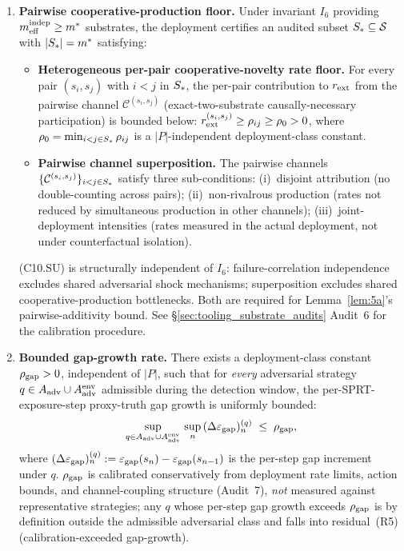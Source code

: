 \begin{theorem}
\begin{enumerate}
\item[(C10)] \textbf{Pairwise cooperative-production floor.}
  Under invariant $I_6$ providing $m_{\mathrm{eff}}^{\mathrm{indep}} \geq m^*$ substrates,
  the deployment certifies an audited subset $S_* \subseteq
  \mathcal{S}$ with $|S_*| = m^*$ satisfying:
  \begin{itemize}
  \item[\textbf{(C10.CN)}] \textbf{Heterogeneous per-pair
    cooperative-novelty rate floor.}  For every pair $(s_i, s_j)$
    with $i < j$ in $S_*$, the per-pair contribution to $r_{\mathrm{ext}}$
    from the pairwise channel $\mathcal{C}^{(s_i, s_j)}$
    (exact-two-substrate causally-necessary participation) is
    bounded below: $r_{\mathrm{ext}}^{(s_i, s_j)} \geq \rho_{ij} \geq \rho_0
    > 0$, where $\rho_0 = \min_{i<j \in S_*} \rho_{ij}$ is a
    $|P|$-independent deployment-class constant.
  \item[\textbf{(C10.SU)}] \textbf{Pairwise channel superposition.}
    The pairwise channels $\{\mathcal{C}^{(s_i, s_j)}\}_{i<j \in
    S_*}$ satisfy three sub-conditions:
    (i)~disjoint attribution (no double-counting across pairs);
    (ii)~non-rivalrous production (rates not reduced by
    simultaneous production in other channels);
    (iii)~joint-deployment intensities (rates measured in the
    actual deployment, not under counterfactual isolation).
  \end{itemize}
  (C10.SU) is structurally independent of $I_6$: failure-correlation
  independence excludes shared adversarial shock mechanisms;
  superposition excludes shared cooperative-production bottlenecks.
  Both are required for Lemma~\ref{lem:5a}'s pairwise-additivity
  bound.  See \S\ref{sec:tooling_substrate_audits} Audit~6 for the
  calibration procedure.
\item[(C11)] \textbf{Bounded gap-growth rate.}  There exists a
  deployment-class constant $\rho_{\mathrm{gap}} > 0$, independent of $|P|$,
  such that for \emph{every} adversarial strategy $q \in A_{\mathrm{adv}}
  \cup A_{\mathrm{adv}}^{\mathrm{env}}$ admissible during the detection
  window, the per-SPRT-exposure-step proxy-truth gap growth is
  uniformly bounded:
  \[
    \sup_{q \in A_{\mathrm{adv}} \cup A_{\mathrm{adv}}^{\mathrm{env}}}\,
    \sup_{n}\, (\Delta \varepsilon_{\mathrm{gap}})_n^{(q)}
    \;\leq\; \rho_{\mathrm{gap}},
  \]
  where $(\Delta \varepsilon_{\mathrm{gap}})_n^{(q)} := \varepsilon_{\mathrm{gap}}(s_n) - \varepsilon_{\mathrm{gap}}(s_{n-1})$
  is the per-step gap increment under $q$.  $\rho_{\mathrm{gap}}$ is calibrated
  conservatively from deployment rate limits, action bounds, and
  channel-coupling structure (Audit~7), \emph{not} measured against
  representative strategies; any $q$ whose per-step gap growth
  exceeds $\rho_{\mathrm{gap}}$ is by definition outside the admissible
  adversarial class and falls into residual~(R5)
  (calibration-exceeded gap-growth).


\end{enumerate}
\end{theorem}
